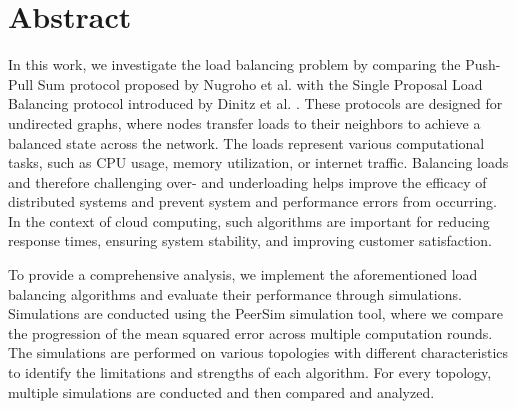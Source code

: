 \chapter*{Abstract}

In this work, we investigate the load balancing problem by comparing the Push-Pull Sum protocol proposed by Nugroho et al. \cite{nugroho2023PushPullSumDataAg} with the Single Proposal Load Balancing protocol introduced by Dinitz et al. \cite{dinitz2022localDealAgreementloadBalancing}. These protocols are designed for undirected graphs, where nodes transfer loads to their neighbors to achieve a balanced state across the network. The loads represent various computational tasks, such as CPU usage, memory utilization, or internet traffic. Balancing loads and therefore challenging over- and underloading helps improve the efficacy of distributed systems and prevent system and performance errors from occurring. In the context of cloud computing, such algorithms are important for reducing response times, ensuring system stability, and improving customer satisfaction.

To provide a comprehensive analysis, we implement the aforementioned load balancing algorithms and evaluate their performance through simulations. Simulations are conducted using the PeerSim simulation tool, where we compare the progression of the mean squared error across multiple computation rounds. The simulations are performed on various topologies with different characteristics to identify the limitations and strengths of each algorithm. For every topology, multiple simulations are conducted and then compared and analyzed.